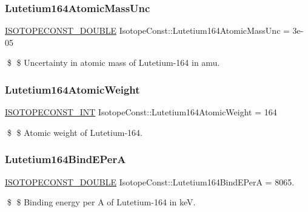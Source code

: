 \subsubsection{\texorpdfstring{Lutetium164\+Atomic\+Mass\+Unc}{Lutetium164AtomicMassUnc}}
{\footnotesize\ttfamily \mbox{\hyperlink{group___isotope_const-_macros_ga8f45a7272ce02c0b4c65c44636ed719a}{I\+S\+O\+T\+O\+P\+E\+C\+O\+N\+S\+T\+\_\+\+D\+O\+U\+B\+LE}} Isotope\+Const\+::\+Lutetium164\+Atomic\+Mass\+Unc = 3e-\/05}

\$ \$ Uncertainty in atomic mass of Lutetium-\/164 in amu. \mbox{\label{group___isotope_const-_lutetium-_lu164_gaec52c6173f8f531bbb32df04dd45076b}} 
\subsubsection{\texorpdfstring{Lutetium164\+Atomic\+Weight}{Lutetium164AtomicWeight}}
{\footnotesize\ttfamily \mbox{\hyperlink{group___isotope_const-_macros_ga5f18360b3e99483a35c32d789e62621c}{I\+S\+O\+T\+O\+P\+E\+C\+O\+N\+S\+T\+\_\+\+I\+NT}} Isotope\+Const\+::\+Lutetium164\+Atomic\+Weight = 164}

\$ \$ Atomic weight of Lutetium-\/164. \mbox{\label{group___isotope_const-_lutetium-_lu164_ga767bcca9c5a884b0cb5b923a5b4c0c11}} 
\subsubsection{\texorpdfstring{Lutetium164\+Bind\+E\+PerA}{Lutetium164BindEPerA}}
{\footnotesize\ttfamily \mbox{\hyperlink{group___isotope_const-_macros_ga8f45a7272ce02c0b4c65c44636ed719a}{I\+S\+O\+T\+O\+P\+E\+C\+O\+N\+S\+T\+\_\+\+D\+O\+U\+B\+LE}} Isotope\+Const\+::\+Lutetium164\+Bind\+E\+PerA = 8065.}

\$ \$ Binding energy per A of Lutetium-\/164 in keV. \mbox{\label{group___isotope_const-_lutetium-_lu164_ga334d51651eb4495b1b8f706b1bf25ed9}} 
